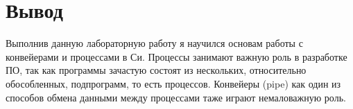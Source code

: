 \section{Вывод}

Выполнив данную лабораторную работу я научился основам работы с конвейерами и процессами в Си. Процессы занимают важную роль в разработке ПО, так как программы зачастую состоят из нескольких, относительно обособленных, подпрограмм, то есть процессов. Конвейеры (pipe) как один из способов обмена данными между процессами таже играют немаловажную роль.

